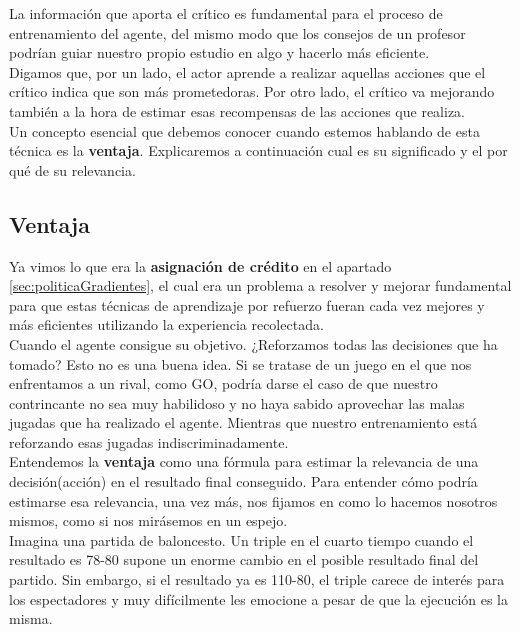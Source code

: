 \documentclass[11pt,fleqn]{book} %
\begin{document}
La información que aporta el crítico es fundamental para el proceso de entrenamiento del agente, del mismo modo que los consejos de un profesor podrían guiar nuestro propio estudio en algo y hacerlo más eficiente.\\

Digamos que, por un lado, el actor aprende a realizar aquellas acciones que el crítico indica que son más prometedoras. Por otro lado, el crítico va mejorando también a la hora de estimar esas recompensas de las acciones que realiza. \\

Un concepto esencial que debemos conocer cuando estemos hablando de esta técnica es la \textbf{ventaja}. Explicaremos a continuación cual es su significado y el por qué de su relevancia. \\

\subsection{Ventaja}

Ya vimos lo que era la \textbf{asignación de crédito} en el apartado \ref{sec:politicaGradientes}, el cual era un problema a resolver y mejorar fundamental para que estas técnicas de aprendizaje por refuerzo fueran cada vez mejores y más eficientes utilizando la experiencia recolectada. \\

Cuando el agente consigue su objetivo. ¿Reforzamos todas las decisiones que ha tomado? Esto no es una buena idea. Si se tratase de un juego en el que nos enfrentamos a un rival, como GO, podría darse el caso de que nuestro contrincante no sea muy habilidoso y no haya sabido aprovechar las malas jugadas que ha realizado el agente. Mientras que nuestro entrenamiento está reforzando esas jugadas indiscriminadamente. \\

Entendemos la \textbf{ventaja} como una fórmula para estimar la relevancia de una decisión(acción) en el resultado final conseguido. Para entender cómo podría estimarse esa relevancia, una vez más, nos fijamos en como lo hacemos nosotros mismos, como si nos mirásemos en un espejo. \\

Imagina una partida de baloncesto. Un triple en el cuarto tiempo cuando el resultado es 78-80 supone un enorme cambio en el posible resultado final del partido. Sin embargo, si el resultado ya es 110-80, el triple carece de interés para los espectadores y muy difícilmente les emocione a pesar de que la ejecución es la misma. \\
\end{document}
